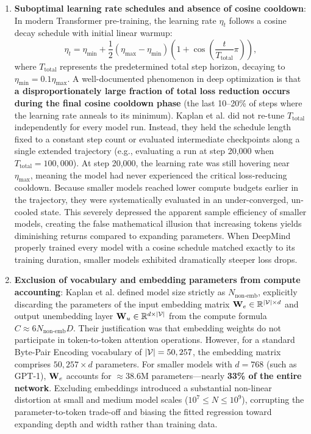 \documentclass[../../main.tex]{subfiles}
\begin{document}
\begin{enumerate}
    \item \textbf{Suboptimal learning rate schedules and absence of cosine cooldown}:
    In modern Transformer pre-training, the learning rate $\eta_t$ follows a cosine decay schedule with initial linear warmup:
    \begin{equation}
    \label{eq:cosine_lr_schedule}
    \eta_t = \eta_{\text{min}} + \frac{1}{2}(\eta_{\text{max}} - \eta_{\text{min}})\left(1 + \cos\left(\frac{t}{T_{\text{total}}}\pi\right)\right),
    \end{equation}
    where $T_{\text{total}}$ represents the predetermined total step horizon, decaying to $\eta_{\text{min}} = 0.1\eta_{\text{max}}$.
    A well-documented phenomenon in deep optimization is that \textbf{a disproportionately large fraction of total loss reduction occurs during the final cosine cooldown phase} (the last 10--20\% of steps where the learning rate anneals to its minimum).
    Kaplan et al. did not re-tune $T_{\text{total}}$ independently for every model run. Instead, they held the schedule length fixed to a constant step count or evaluated intermediate checkpoints along a single extended trajectory (e.g., evaluating a run at step 20,000 when $T_{\text{total}} = 100,000$). At step 20,000, the learning rate was still hovering near $\eta_{\text{max}}$, meaning the model had never experienced the critical loss-reducing cooldown.
    Because smaller models reached lower compute budgets earlier in the trajectory, they were systematically evaluated in an under-converged, un-cooled state. This severely depressed the apparent sample efficiency of smaller models, creating the false mathematical illusion that increasing tokens yields diminishing returns compared to expanding parameters. When DeepMind properly trained every model with a cosine schedule matched exactly to its training duration, smaller models exhibited dramatically steeper loss drops.

    \item \textbf{Exclusion of vocabulary and embedding parameters from compute accounting}:
    Kaplan et al. defined model size strictly as $N_{\text{non-emb}}$, explicitly discarding the parameters of the input embedding matrix $\mathbf{W}_e \in \mathbb{R}^{|\mathcal{V}| \times d}$ and output unembedding layer $\mathbf{W}_u \in \mathbb{R}^{d \times |\mathcal{V}|}$ from the compute formula $C \approx 6 N_{\text{non-emb}} D$. Their justification was that embedding weights do not participate in token-to-token attention operations.
    However, for a standard Byte-Pair Encoding vocabulary of $|\mathcal{V}| = 50,257$, the embedding matrix comprises $50,257 \times d$ parameters. For smaller models with $d = 768$ (such as GPT-1), $\mathbf{W}_e$ accounts for $\approx 38.6\text{M}$ parameters---nearly \textbf{33\% of the entire network}.
    Excluding embeddings introduced a substantial non-linear distortion at small and medium model scales ($10^7 \le N \le 10^9$), corrupting the parameter-to-token trade-off and biasing the fitted regression toward expanding depth and width rather than training data.


\end{enumerate}
\end{document}

